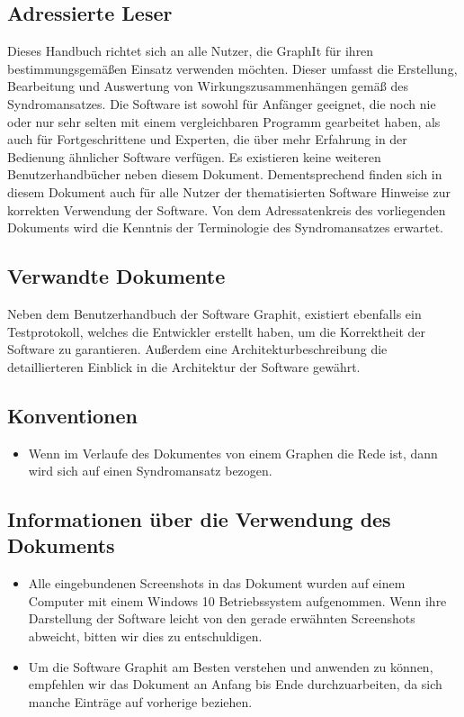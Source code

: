 \documentclass[enabledeprecatedfontcommands,fontsize=11pt,paper=a4,twoside]{scrartcl}
\newcounter{one}
\begin{document}
\subsection{Adressierte Leser}
Dieses Handbuch richtet sich an alle Nutzer, die GraphIt für ihren bestimmungsgemäßen Einsatz verwenden möchten. Dieser umfasst die Erstellung, Bearbeitung und Auswertung von Wirkungszusammenhängen gemäß des Syndromansatzes. Die Software ist sowohl für Anfänger geeignet, die noch nie oder nur sehr selten mit einem vergleichbaren Programm gearbeitet haben, als auch für Fortgeschrittene und Experten, die über mehr Erfahrung in der Bedienung ähnlicher Software verfügen. Es existieren keine weiteren Benutzerhandbücher neben diesem Dokument. Dementsprechend finden sich in diesem Dokument auch für alle Nutzer der thematisierten Software Hinweise zur korrekten Verwendung der Software. Von dem Adressatenkreis des vorliegenden Dokuments wird die Kenntnis der Terminologie des Syndromansatzes erwartet.  
\subsection{Verwandte Dokumente}
Neben dem Benutzerhandbuch der Software Graphit, existiert ebenfalls ein Testprotokoll, welches die Entwickler erstellt haben, um die Korrektheit der Software zu garantieren. Außerdem eine Architekturbeschreibung die detaillierteren Einblick in die Architektur der Software gewährt. 
\subsection{Konventionen}
\begin{itemize}
	\item Wenn im Verlaufe des Dokumentes von einem Graphen die Rede ist, dann wird sich auf einen Syndromansatz bezogen.
\end{itemize}

\subsection{Informationen über die Verwendung des Dokuments}

\begin{itemize}
	\item Alle eingebundenen Screenshots in das Dokument wurden auf einem Computer mit einem Windows 10 Betriebssystem aufgenommen. Wenn ihre Darstellung der Software leicht von den gerade erwähnten Screenshots abweicht, bitten wir dies zu entschuldigen.
	\item Um die Software Graphit am Besten verstehen und anwenden zu können, empfehlen wir das Dokument an Anfang bis Ende durchzuarbeiten, da sich manche Einträge auf vorherige beziehen. 
\end{itemize}
\end{document}
